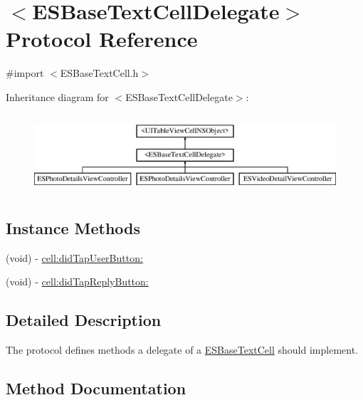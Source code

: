 \hypertarget{protocol_e_s_base_text_cell_delegate-p}{}\section{$<$E\+S\+Base\+Text\+Cell\+Delegate$>$ Protocol Reference}
\label{protocol_e_s_base_text_cell_delegate-p}


{\ttfamily \#import $<$E\+S\+Base\+Text\+Cell.\+h$>$}

Inheritance diagram for $<$E\+S\+Base\+Text\+Cell\+Delegate$>$\+:\begin{figure}[H]
\begin{center}
\leavevmode
\includegraphics[height=2.947368cm]{protocol_e_s_base_text_cell_delegate-p}
\end{center}
\end{figure}
\subsection*{Instance Methods}
\begin{DoxyCompactItemize}
\item 
(void) -\/ \hyperlink{protocol_e_s_base_text_cell_delegate-p_aee8fd887e7e49fc83deaf8a47c2f2747}{cell\+:did\+Tap\+User\+Button\+:}
\item 
(void) -\/ \hyperlink{protocol_e_s_base_text_cell_delegate-p_aad0606bd4e03924cbf486c97d3fe8f01}{cell\+:did\+Tap\+Reply\+Button\+:}
\end{DoxyCompactItemize}


\subsection{Detailed Description}
The protocol defines methods a delegate of a \hyperlink{interface_e_s_base_text_cell}{E\+S\+Base\+Text\+Cell} should implement. 

\subsection{Method Documentation}
\hypertarget{protocol_e_s_base_text_cell_delegate-p_aad0606bd4e03924cbf486c97d3fe8f01}{}
